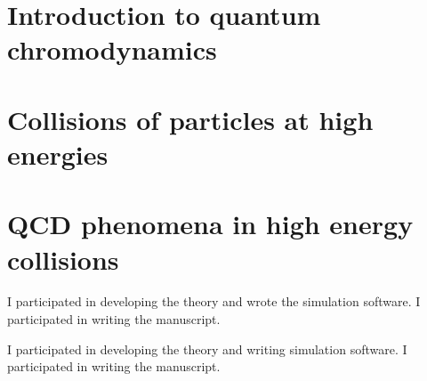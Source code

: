 \documentclass[11pt]{book}
\begin{document}
\mainmatter
\setcounter{table}{0} 
\setcounter{page}{1}

\chap{\myTitle}
\newpage

\chapter{Introduction to quantum chromodynamics}

\chapter{Collisions of particles at high energies}

\chapter{QCD phenomena in high energy collisions}


\renewcommand{\bibname}{References}





I participated in developing the theory and wrote the simulation software. I participated in writing the manuscript.


I participated in developing the theory and writing simulation software. I participated in writing the manuscript.


\end{document}
